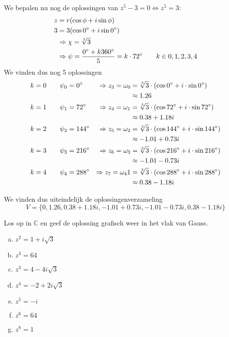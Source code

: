 \documentclass[12pt,twoside,a4paper]{article}
\begin{document}
We bepalen nu nog de oplossingen van $z^5 - 3 = 0 \Leftrightarrow z^5 = 3$:
\begin{align*}
  z &= r(\cos\phi + i\sin\phi)\\
  3 &= 3(\cos0^\circ + i\sin0^\circ)\\
    &\Rightarrow \chi = \sqrt[5]{3}\\
    &\Rightarrow \psi = \dfrac{ 0^\circ +  k360^\circ }{ 5 } = k\cdot72^\circ \qquad k\in{0, 1, 2, 3, 4}
\end{align*}
We vinden dus nog 5 oplossingen
\begin{align*}
  k=0 \qquad \psi_0 &= 0^\circ   &\Rightarrow z_3=\omega_0 &= \sqrt[5]{3} \cdot (\cos 0^\circ + i \cdot \sin 0^\circ)\\
            &             &           &\approx 1.26\\
  k=1 \qquad \psi_1 &= 72^\circ  &\Rightarrow z_4=\omega_1 &= \sqrt[5]{3} \cdot (\cos 72^\circ + i \cdot \sin 72^\circ)\\
            &             &           &\approx 0.38 + 1.18i\\
  k=2 \qquad \psi_2 &= 144^\circ &\Rightarrow z_5=\omega_2 &= \sqrt[5]{3} \cdot (\cos 144^\circ + i \cdot \sin 144^\circ)\\
            &             &           &\approx -1.01 + 0.73i\\
  k=3 \qquad \psi_3 &= 216^\circ &\Rightarrow z_6=\omega_3 &= \sqrt[5]{3} \cdot (\cos 216^\circ + i \cdot \sin 216^\circ)\\
            &             &           &\approx -1.01 - 0.73i\\
  k=4 \qquad \psi_4 &= 288^\circ &\Rightarrow z_7=\omega_41 &= \sqrt[5]{3} \cdot (\cos 288^\circ + i \cdot \sin 288^\circ)\\
            &             &           &\approx 0.38 - 1.18i\\
\end{align*}

We vinden dus uiteindelijk de oplossingenverzameling
\[V=\{0, 1.26, 0.38 + 1.18i, -1.01 + 0.73i, -1.01 - 0.73i, 0.38 - 1.18i\}\]



\begin{oefening}
Los op in $\mathbb{C}$ en geef de oplossing grafisch weer in het vlak van Gauss.
\begin{multicols}{2}
\begin{enumerate}[(a)]
  \itemsep.5em
  \item $\displaystyle z^2=1+i\sqrt{3}$
  \item $\displaystyle z^3=64$
  \item $\displaystyle z^3=4-4i\sqrt{3}$
  \item $\displaystyle z^4=-2+2i\sqrt{3}$
  \item $\displaystyle z^5=-i$
  \item $\displaystyle z^6=64$
  \item $\displaystyle z^8=1$
\end{enumerate}
\end{multicols}

\end{oefening}
\end{document}
